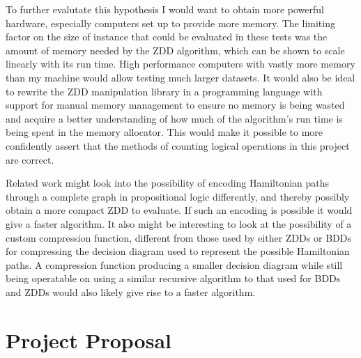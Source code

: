 \documentclass[12pt,a4paper,twoside,openright]{report}
\begin{document}
To further evalutate this hypothesis I would want to obtain more powerful hardware, especially computers set up to provide more memory. The limiting factor on the size of instance that could be evaluated in these tests was the amount of memory needed by the ZDD algorithm, which can be shown to scale linearly with its run time. High performance computers with vastly more memory than my machine would allow testing much larger datasets. It would also be ideal to rewrite the ZDD manipulation library in a programming language with support for manual memory management to ensure no memory is being wasted and acquire a better understanding of how much of the algorithm's run time is being spent in the memory allocator. This would make it possible to more confidently assert that the methods of counting logical operations in this project are correct.

Related work might look into the possibility of encoding Hamiltonian paths through a complete graph in propositional logic differently, and thereby possibly obtain a more compact ZDD to evaluate. If such an encoding is possible it would give a faster algorithm. It also might be interesting to look at the possibility of a custom compression function, different from those used by either ZDDs or BDDs for compressing the decision diagram used to represent the possible Hamiltonian paths. A compression function producing a smaller decision diagram while still being operatable on using a similar recursive algorithm to that used for BDDs and ZDDs would also likely give rise to a faster algorithm. 



\appendix

\chapter{Project Proposal}


\end{document}

